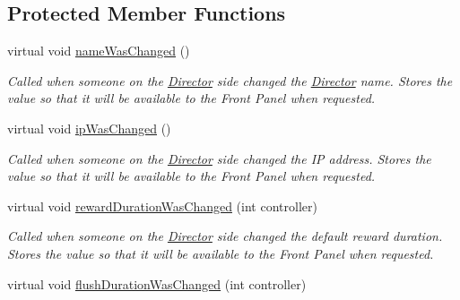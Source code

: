 \subsection*{Protected Member Functions}
\begin{DoxyCompactItemize}
\item 
\hypertarget{class_f_p_interface_a4582783afa21edafe30d900889324ca1}{virtual void \hyperlink{class_f_p_interface_a4582783afa21edafe30d900889324ca1}{name\-Was\-Changed} ()}\label{class_f_p_interface_a4582783afa21edafe30d900889324ca1}

\begin{DoxyCompactList}\small\item\em Called when someone on the \hyperlink{class_director}{Director} side changed the \hyperlink{class_director}{Director} name. Stores the value so that it will be available to the Front Panel when requested. \end{DoxyCompactList}\item 
\hypertarget{class_f_p_interface_ada309d75eefe2043318d0d3c203b0cfd}{virtual void \hyperlink{class_f_p_interface_ada309d75eefe2043318d0d3c203b0cfd}{ip\-Was\-Changed} ()}\label{class_f_p_interface_ada309d75eefe2043318d0d3c203b0cfd}

\begin{DoxyCompactList}\small\item\em Called when someone on the \hyperlink{class_director}{Director} side changed the I\-P address. Stores the value so that it will be available to the Front Panel when requested. \end{DoxyCompactList}\item 
\hypertarget{class_f_p_interface_ac5732fcfe16d3a3a4dfa5aaae9658663}{virtual void \hyperlink{class_f_p_interface_ac5732fcfe16d3a3a4dfa5aaae9658663}{reward\-Duration\-Was\-Changed} (int controller)}\label{class_f_p_interface_ac5732fcfe16d3a3a4dfa5aaae9658663}

\begin{DoxyCompactList}\small\item\em Called when someone on the \hyperlink{class_director}{Director} side changed the default reward duration. Stores the value so that it will be available to the Front Panel when requested. \end{DoxyCompactList}\item 
\hypertarget{class_f_p_interface_a79917bfd3c4cf7cfd35c0c38bd91ca44}{virtual void \hyperlink{class_f_p_interface_a79917bfd3c4cf7cfd35c0c38bd91ca44}{flush\-Duration\-Was\-Changed} (int controller)}\label{class_f_p_interface_a79917bfd3c4cf7cfd35c0c38bd91ca44}


\end{DoxyCompactItemize}
